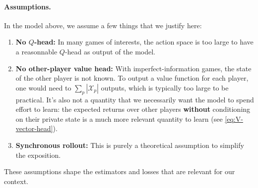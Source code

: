 \documentclass[12pt, a4paper]{article}
\begin{document}
\paragraph{Assumptions.}
In the model above, we assume a few things that we justify here:
\begin{enumerate}
  \item \textbf{No $Q$-head:} In many games of interests, the action space is too large to have a reasonnable $Q$-head as output of the model.
  \item \textbf{No other-player value head:} With imperfect-information games, the state of the other player is not known.
  To output a value function for each player, one would need to $\sum_p |\mathcal{X}_p|$ outputs, which is typically too large to be practical.
  It's also not a quantity that we necessarily want the model to spend effort to learn: the expected returns over other players \textbf{without} conditioning on their private state is a much more relevant quantity to learn (see \autoref{eq:V-vector-head}).
  \item \textbf{Synchronous rollout:} This is purely a theoretical assumption to simplify the exposition.
\end{enumerate}
These assumptions shape the estimators and losses that are relevant for our context.
\end{document}
